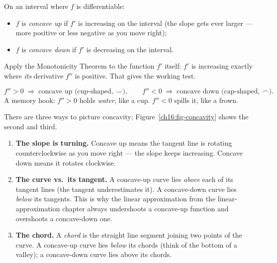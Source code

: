 \begin{definition}[Concavity]\label{ch16:def-concave}
On an interval where $f$ is differentiable:
\begin{itemize}
\item $f$ is \emph{concave up} if $f'$ is increasing on the interval (the slope
gets ever larger --- more positive or less negative as you move right);
\item $f$ is \emph{concave down} if $f'$ is decreasing on the interval.
\end{itemize}
\end{definition}

Apply the Monotonicity Theorem to the function $f'$ itself: $f'$ is increasing
exactly where \emph{its} derivative $f''$ is positive. That gives the working test.

\begin{focusbox}
\[
f''>0 \;\Longrightarrow\; \text{concave up (cup-shaped, }\smile\text{)},
\qquad
f''<0 \;\Longrightarrow\; \text{concave down (cap-shaped, }\frown\text{)}.
\]
A memory hook: $f''>0$ holds \emph{water}, like a cup. $f''<0$ spills it, like a
frown.
\end{focusbox}

\begin{intuitionbox}
There are three ways to picture concavity; Figure~\ref{ch16:fig-concavity}
shows the second and third.
\begin{enumerate}
\item \textbf{The slope is turning.} Concave up means the tangent line is rotating
counterclockwise as you move right --- the slope keeps increasing. Concave down
means it rotates clockwise.
\item \textbf{The curve vs.\ its tangent.} A concave-up curve lies \emph{above}
each of its tangent lines (the tangent underestimates it). A concave-down curve
lies \emph{below} its tangents. This is why the linear approximation from the
linear-approximation chapter always undershoots a concave-up function and
overshoots a concave-down one.
\item \textbf{The chord.} A \emph{chord} is the straight line segment joining two
points of the curve. A concave-up curve lies \emph{below} its chords (think of the
bottom of a valley); a concave-down curve lies above its chords.
\end{enumerate}
\end{intuitionbox}

